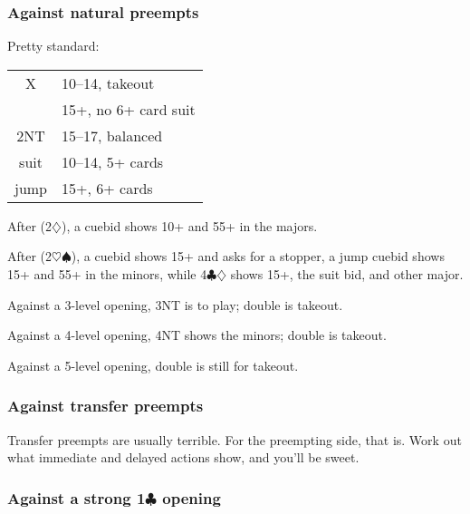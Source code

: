 \documentclass[a4paper, twoside, 11pt]{article}
\begin{document}
\begin{multicols}{3}
\begin{multicols}{2}
\end{multicols}

\subsubsection*{Against natural preempts}

Pretty standard:
\begin{center}
\begin{tabular}{ |cl| }
 \hline
 X & 10--14, takeout \\
 & 15+, no 6+ card suit \\
 2NT & 15--17, balanced \\
 suit & 10--14, 5+ cards \\
 jump & 15+, 6+ cards\\
 \hline
\end{tabular}
\end{center}

After (2$\diamondsuit$), a cuebid shows 10+ and 55+ in the majors.

After (2$\heartsuit\spadesuit$), a cuebid shows 15+ and asks for a stopper, a jump cuebid shows 15+ and 55+ in the minors, while 4$\clubsuit\diamondsuit$ shows 15+, the suit bid, and other major.

Against a 3-level opening, 3NT is to play; double is takeout.

Against a 4-level opening, 4NT shows the minors; double is takeout.

Against a 5-level opening, double is still for takeout.

\subsubsection*{Against transfer preempts}
Transfer preempts are usually terrible. For the preempting side, that is. Work out what immediate and delayed actions show, and you'll be sweet.

\subsubsection*{Against a strong 1$\clubsuit$ opening}


\end{multicols}
\end{document}
